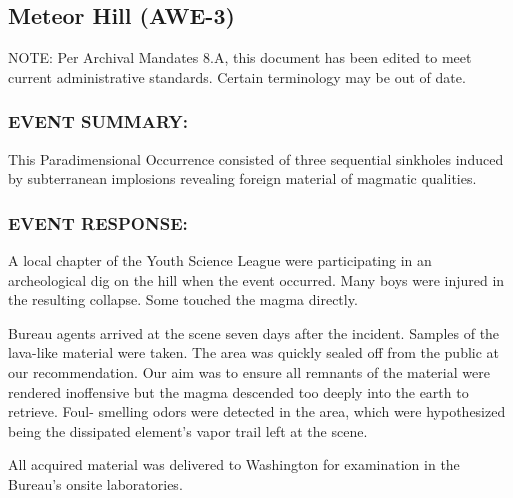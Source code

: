 \subsection*{Meteor Hill (AWE-3)}
\par NOTE: Per Archival Mandates 8.A, this document has been
edited to meet current administrative standards. Certain
terminology may be out of date.
\subsubsection*{EVENT SUMMARY:}
\par This Paradimensional Occurrence consisted of three sequential
sinkholes induced by subterranean implosions revealing foreign
material of magmatic qualities.
\subsubsection*{EVENT RESPONSE:}
\par A local chapter of the Youth Science League were participating in
an archeological dig on the hill when the event occurred. Many
boys were injured in the resulting collapse. Some touched the
magma directly.
\par Bureau agents arrived at the scene seven days after the incident.
Samples of the lava-like material were taken. The area was quickly
sealed off from the public at our recommendation. Our aim was to
ensure all remnants of the material were rendered inoffensive but
the magma descended too deeply into the earth to retrieve. Foul-
smelling odors were detected in the area, which were
hypothesized being the dissipated element's vapor trail left at the
scene.
\par All acquired material was delivered to Washington for examination
in the Bureau's onsite laboratories.